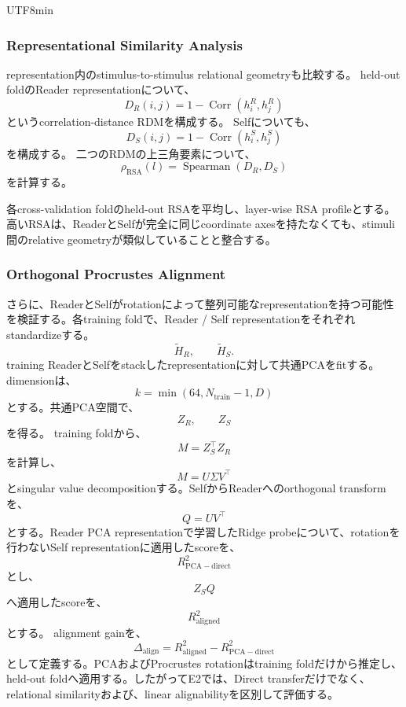 \documentclass{article} %
\begin{document}
\begin{CJK*}{UTF8}{min}
\subsubsection{Representational Similarity Analysis}

representation内のstimulus-to-stimulus relational geometryも比較する。
held-out foldのReader representationについて、
\[
D_R(i,j)
=
1-
\operatorname{Corr}
(
h_i^R,h_j^R
)
\]
というcorrelation-distance RDMを構成する。
Selfについても、
\[
D_S(i,j)
=
1-
\operatorname{Corr}
(
h_i^S,h_j^S
)
\]
を構成する。
二つのRDMの上三角要素について、
\[
\rho_{\mathrm{RSA}}(l)
=
\operatorname{Spearman}
(
D_R,D_S
)
\]
を計算する。

各cross-validation foldのheld-out RSAを平均し、layer-wise RSA profileとする。高いRSAは、ReaderとSelfが完全に同じcoordinate axesを持たなくても、stimuli間のrelative geometryが類似していることと整合する。


\subsubsection{Orthogonal Procrustes Alignment}

さらに、ReaderとSelfがrotationによって整列可能なrepresentationを持つ可能性を検証する。各training foldで、Reader / Self representationをそれぞれstandardizeする。
\[
\widetilde H_R,
\qquad
\widetilde H_S.
\]
training ReaderとSelfをstackしたrepresentationに対して共通PCAをfitする。dimensionは、
\[
k
=
\min
(
64,
N_{\mathrm{train}}-1,
D
)
\]
とする。共通PCA空間で、
\[
Z_R,
\qquad
Z_S
\]
を得る。
training foldから、
\[
M
=
Z_S^\top Z_R
\]
を計算し、
\[
M
=
U\Sigma V^\top
\]
とsingular value decompositionする。SelfからReaderへのorthogonal transformを、
\[
Q
=
UV^\top
\]
とする。Reader PCA representationで学習したRidge probeについて、rotationを行わないSelf representationに適用したscoreを、
\[
R^2_{\mathrm{PCA-direct}}
\]
とし、
\[
Z_SQ
\]
へ適用したscoreを、
\[
R^2_{\mathrm{aligned}}
\]
とする。
alignment gainを、
\[
\Delta_{\mathrm{align}}
=
R^2_{\mathrm{aligned}}
-
R^2_{\mathrm{PCA-direct}}
\]
として定義する。PCAおよびProcrustes rotationはtraining foldだけから推定し、held-out foldへ適用する。したがってE2では、Direct transferだけでなく、relational similarityおよび、linear alignabilityを区別して評価する。




\end{CJK*}
\end{document}
